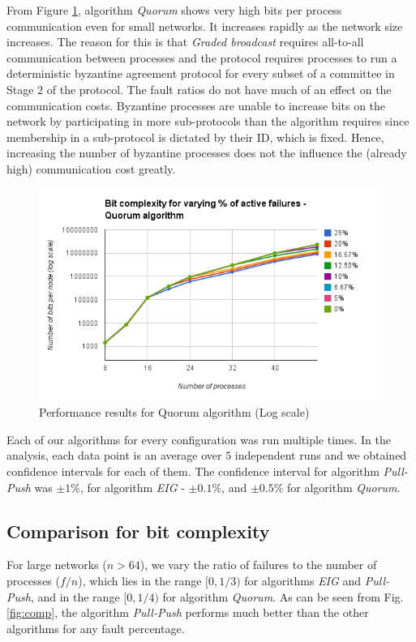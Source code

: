 From Figure \ref{fig:quorum}, algorithm \textit{Quorum} shows very high bits per process communication even for small networks. It increases rapidly as the network size increases. The reason for this is that \textit{Graded broadcast} requires all-to-all communication between processes and the protocol requires processes to run a deterministic byzantine agreement protocol for every subset of a committee in Stage $2$ of the protocol. The fault ratios do not have much of an effect on the communication costs. Byzantine processes are unable to increase bits on the network by participating in more sub-protocols than the algorithm requires since membership in a sub-protocol is dictated by their ID, which is fixed. Hence, increasing the number of byzantine processes does not the influence the (already high) communication cost greatly. 
\begin{figure}[ht]
 \centering
\vspace{-1mm}
\includegraphics[scale=0.4]{quorum}
\vspace{-1mm}
\caption{Performance results for Quorum algorithm (Log scale)}
 \label{fig:quorum}
\vspace{-4mm}
\end{figure}

Each of our algorithms for every configuration was run multiple times. In the analysis, each data point is an average over $5$ independent runs and we obtained confidence intervals for each of them. The confidence interval for algorithm \textit{Pull-Push} was $\pm 1\%$, for algorithm \textit{EIG} - $\pm 0.1\%$, and $\pm 0.5\%$ for algorithm \textit{Quorum}.

\subsection{Comparison for bit complexity}
For large networks ($n > 64$), we vary the ratio of failures to the number of processes ($f/n$), which lies in the range $[0, 1/3)$ for algorithms \textit{EIG} and \textit{Pull-Push}, and in the range $[0, 1/4)$ for algorithm \textit{Quorum}.
        As can be seen from Fig. \ref{fig:comp}, the algorithm \textit{Pull-Push} performs much better than the other algorithms for any fault percentage.


